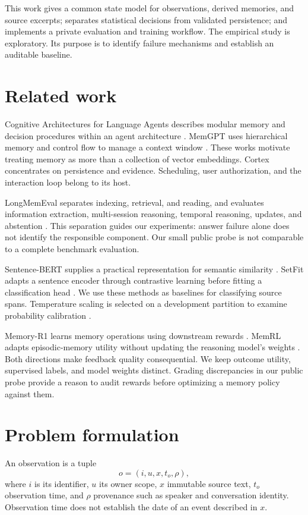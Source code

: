 \documentclass[11pt]{article}
\begin{document}
This work gives a common state model for observations, derived memories, and source excerpts; separates statistical decisions from validated persistence; and implements a private evaluation and training workflow. The empirical study is exploratory. Its purpose is to identify failure mechanisms and establish an auditable baseline.

\section{Related work}
Cognitive Architectures for Language Agents describes modular memory and decision procedures within an agent architecture \citep{coala}. MemGPT uses hierarchical memory and control flow to manage a context window \citep{memgpt}. These works motivate treating memory as more than a collection of vector embeddings. Cortex concentrates on persistence and evidence. Scheduling, user authorization, and the interaction loop belong to its host.

LongMemEval separates indexing, retrieval, and reading, and evaluates information extraction, multi-session reasoning, temporal reasoning, updates, and abstention \citep{longmem}. This separation guides our experiments: answer failure alone does not identify the responsible component. Our small public probe is not comparable to a complete benchmark evaluation.

Sentence-BERT supplies a practical representation for semantic similarity \citep{sbert}. SetFit adapts a sentence encoder through contrastive learning before fitting a classification head \citep{setfit}. We use these methods as baselines for classifying source spans. Temperature scaling is selected on a development partition to examine probability calibration \citep{calibration}.

Memory-R1 learns memory operations using downstream rewards \citep{memoryr1}. MemRL adapts episodic-memory utility without updating the reasoning model's weights \citep{memrl}. Both directions make feedback quality consequential. We keep outcome utility, supervised labels, and model weights distinct. Grading discrepancies in our public probe provide a reason to audit rewards before optimizing a memory policy against them.

\section{Problem formulation}
An observation is a tuple
\[
 o=(i,u,x,t_o,\rho),
\]
where $i$ is its identifier, $u$ its owner scope, $x$ immutable source text, $t_o$ observation time, and $\rho$ provenance such as speaker and conversation identity. Observation time does not establish the date of an event described in $x$.
\end{document}
